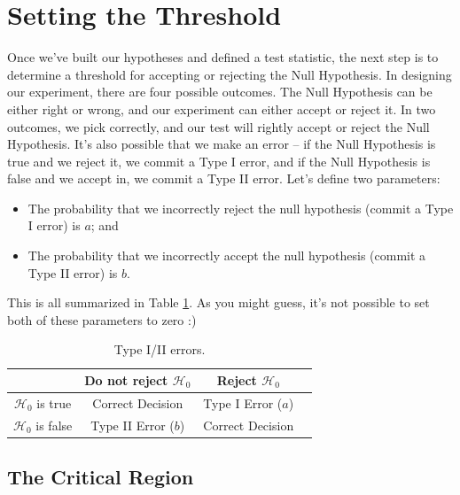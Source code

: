 \documentclass{article}
\numberwithin{equation}{section}
\begin{document}
\section{Setting the Threshold \label{sec_threshold}}

Once we've built our hypotheses and defined a test statistic, the next step is to determine a threshold for accepting or rejecting the Null Hypothesis. In designing our experiment, there are four possible outcomes. The Null Hypothesis can be either right or wrong, and our experiment can either accept or reject it. In two outcomes, we pick correctly, and our test will rightly accept or reject the Null Hypothesis. It's also possible that we make an error  -- if the Null Hypothesis is true and we reject it, we commit a Type I error, and if the Null Hypothesis is false and we accept in, we commit a Type II error. Let's define two parameters:
\begin{itemize}
	\item The probability that we incorrectly reject the null hypothesis (commit a Type I error) is $a$; and
	\item The probability that we incorrectly accept the null hypothesis (commit a Type II error) is $b$.
\end{itemize}
This is all summarized in Table \ref{tab_errors}. As you might guess, it's not possible to set both of these parameters to zero :) 

\begin{table}
	\begin{tabular}{c|c|c|c|}
		& Do not reject $\mathcal{H}_0$ & Reject $\mathcal{H}_0$ \\
		\hline
		$\mathcal{H}_0$ is true & Correct Decision & Type I Error ($a$)\\
		$\mathcal{H}_0$ is false & Type II Error ($b$) & Correct Decision\\
		\hline
	\end{tabular}
	\centering
	\captionsetup{width=0.6\textwidth}
	\caption{\label{tab_errors}  Type I/II errors.}
\end{table}

\subsection{The Critical Region}
\end{document}
